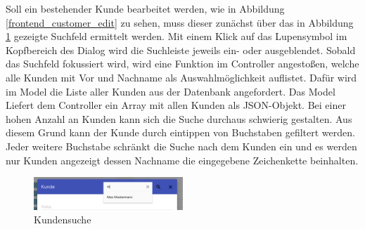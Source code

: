 Soll ein bestehender Kunde bearbeitet werden, wie in Abbildung \ref{frontend_customer_edit} zu sehen, muss dieser zunächst über das in Abbildung \ref{frontend_customer_search}
gezeigte Suchfeld ermittelt werden. Mit einem Klick auf das Lupensymbol im Kopfbereich des Dialog wird die Suchleiste jeweils ein- oder ausgeblendet. Sobald das Suchfeld
fokussiert wird, wird eine Funktion im Controller angestoßen, welche alle Kunden mit Vor und Nachname als Auswahlmöglichkeit auflistet. Dafür wird im Model die Liste aller
Kunden aus der Datenbank angefordert. Das Model Liefert dem Controller ein Array mit allen Kunden als JSON-Objekt. Bei einer hohen Anzahl an Kunden kann sich die Suche durchaus schwierig
gestalten. Aus diesem Grund kann der Kunde durch eintippen von Buchstaben gefiltert werden. Jeder weitere Buchstabe schränkt die Suche nach dem Kunden ein und es
werden nur Kunden angezeigt dessen Nachname die eingegebene Zeichenkette beinhalten.

\begin{figure}[H]
\centering\includegraphics[width=0.5\textwidth]{images/frontend_customer_search.png}
\caption{Kundensuche}
\label{frontend_customer_search}
\end{figure}

